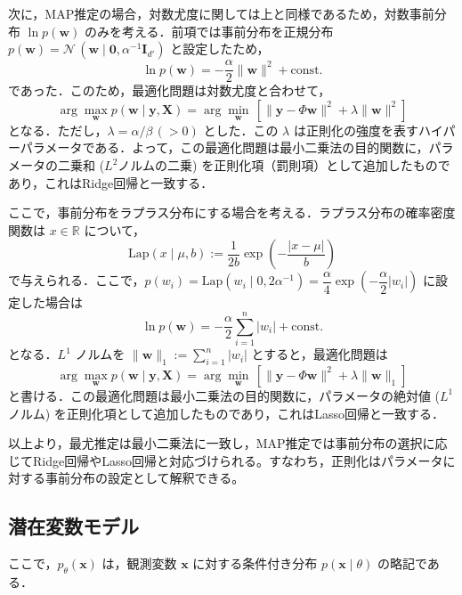 \documentclass[titlepage]{ltjsbook}
\begin{document}
次に，MAP推定の場合，対数尤度に関しては上と同様であるため，対数事前分布 $\ln p(\mathbf{w})$ のみを考える．前項では事前分布を正規分布 $p(\mathbf{w})=\mathcal{N}\,\left(\mathbf{w}\mid \mathbf{0},\alpha^{-1} \mathbf{I}_{d'}\right)$ と設定したため，
\begin{equation}
\ln p(\mathbf{w}) = -\frac{\alpha}{2}\lVert \mathbf{w}\rVert^2 + \text{const.}
\end{equation}
であった．このため，最適化問題は対数尤度と合わせて，
\begin{equation}
\arg\max_{\mathbf{w}} p(\mathbf{w} \mid \mathbf{y}, \mathbf{X}) =\arg\min_{\mathbf{w}}\, \left[\lVert \mathbf{y}-\Phi\mathbf{w}\rVert^2 + \lambda \lVert \mathbf{w}\rVert^2 \right]
\end{equation}
となる．ただし，$\lambda = \alpha / \beta\, (>0)$ とした．この $\lambda$ は正則化の強度を表すハイパーパラメータである．よって，この最適化問題は最小二乗法の目的関数に，パラメータの二乗和 ($L^2$ノルムの二乗) を正則化項（罰則項）として追加したものであり，これはRidge回帰と一致する．

ここで，事前分布をラプラス分布にする場合を考える．ラプラス分布の確率密度関数は $x\in \mathbb{R}$ について，
\begin{equation}
\textrm{Lap}(x\mid \mu, b):=\dfrac{1}{2b}\exp\left(-\dfrac{\lvert x-\mu\rvert}{b}\right)
\end{equation}
で与えられる．ここで，$p(w_i)=\textrm{Lap}(w_i \mid 0, 2\alpha^{-1})=\dfrac{\alpha}{4}\exp\left(-\dfrac{\alpha}{2} \lvert w_i\rvert \right)$ に設定した場合は
\begin{equation}
\ln p(\mathbf{w}) = -\frac{\alpha}{2} \sum_{i=1}^n \lvert w_i\rvert+ \text{const.}
\end{equation}
となる．$L^1$ ノルムを $\lVert \mathbf{w}\rVert _1 := \sum_{i=1}^n \lvert w_i\rvert$ とすると，最適化問題は
\begin{equation}
\arg\max_{\mathbf{w}} p(\mathbf{w} \mid \mathbf{y}, \mathbf{X}) =\arg\min_{\mathbf{w}}\, \left[\lVert \mathbf{y}-\Phi\mathbf{w}\rVert^2 + \lambda\lVert \mathbf{w}\rVert _1 \right]
\end{equation}
と書ける．この最適化問題は最小二乗法の目的関数に，パラメータの絶対値 ($L^1$ノルム) を正則化項として追加したものであり，これはLasso回帰と一致する．

以上より，最尤推定は最小二乗法に一致し，MAP推定では事前分布の選択に応じてRidge回帰やLasso回帰と対応づけられる。すなわち，正則化はパラメータに対する事前分布の設定として解釈できる。

\subsection{潜在変数モデル}
ここで，$p_\theta(\mathbf{x})$ は，観測変数 $\mathbf{x}$ に対する条件付き分布 $p(\mathbf{x} \mid \theta)$ の略記である．
\end{document}
